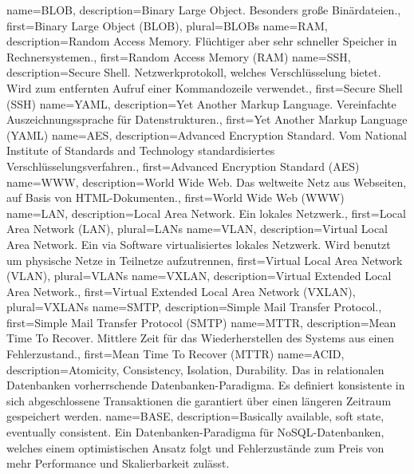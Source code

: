 {%
    name={BLOB},
    description={Binary Large Object. Besonders große Binärdateien.},
    first={Binary Large Object (BLOB)},
    plural={BLOBs}
}
{%
    name={RAM},
    description={Random Access Memory. Flüchtiger aber sehr schneller
    Speicher in Rechnersystemen.},
    first={Random Access Memory (RAM)}
}
{%
    name={SSH},
    description={Secure Shell. Netzwerkprotokoll, welches
    Verschlüsselung bietet. Wird zum entfernten Aufruf einer
    Kommandozeile verwendet.},
    first={Secure Shell (SSH)}
}
{%
    name={YAML},
    description={Yet Another Markup Language. Vereinfachte
    Auszeichnungssprache für Datenstrukturen.},
    first={Yet Another Markup Language (YAML)}
}
{%
    name={AES},
    description={Advanced Encryption Standard. Vom National Institute
    of Standards and Technology standardisiertes
    Verschlüsselungsverfahren.},
    first={Advanced Encryption Standard (AES)}
}
{%
    name={WWW},
    description={World Wide Web. Das weltweite Netz aus Webseiten, auf
    Basis von HTML-Dokumenten.},
    first={World Wide Web (WWW)}
}
{%
    name={LAN},
    description={Local Area Network. Ein lokales Netzwerk.},
    first={Local Area Network (LAN)},
    plural={LANs}
}
{%
    name={VLAN},
    description={Virtual Local Area Network. Ein via Software
    virtualisiertes lokales Netzwerk. Wird benutzt um physische Netze in
    Teilnetze aufzutrennen},
    first={Virtual Local Area Network (VLAN)},
    plural={VLANs}
}
{%
    name={VXLAN},
    description={Virtual Extended Local Area Network.},
    first={Virtual Extended Local Area Network (VXLAN)},
    plural={VXLANs}
}
{%
    name={SMTP},
    description={Simple Mail Transfer Protocol.},
    first={Simple Mail Transfer Protocol (SMTP)}
}
{%
    name={MTTR},
    description={Mean Time To Recover. Mittlere Zeit für das
    Wiederherstellen des Systems aus einen Fehlerzustand.},
    first={Mean Time To Recover (MTTR)}
}
{%
    name={ACID},
    description={Atomicity, Consistency, Isolation, Durability. Das in
    relationalen Datenbanken vorherrschende Datenbanken-Paradigma. Es
    definiert konsistente in sich abgeschlossene Transaktionen die
    garantiert über einen längeren Zeitraum gespeichert werden.}
}
{%
    name={BASE},
    description={Basically available, soft state, eventually consistent.
    Ein Datenbanken-Paradigma für NoSQL-Datenbanken, welches einem
    optimistischen Ansatz folgt und Fehlerzustände zum Preis von mehr
    Performance und Skalierbarkeit zulässt.}
}
